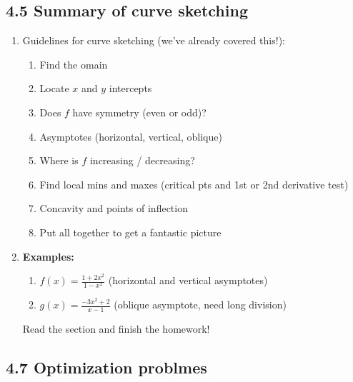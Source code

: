 \documentclass{article}
\begin{document}
\subsection{4.5 Summary of curve sketching}
\begin{enumerate}

\item Guidelines for curve sketching (we've already covered this!):
\begin{enumerate}
\item Find the omain
\item Locate $x$ and $y$ intercepts
\item Does $f$ have symmetry (even or odd)?
\item Asymptotes (horizontal, vertical, oblique)
\item Where is $f$ increasing / decreasing?
\item Find local mins and maxes (critical pts and 1st or 2nd derivative test)
\item Concavity and points of inflection 
\item Put all together to get a fantastic picture
\end{enumerate}

\item {\bf Examples:}
\begin{enumerate}
\item $f(x) = \frac{1+2x^2}{1-x^2}$ (horizontal and vertical asymptotes)
\item $ g(x) = \frac{-3x^2+2}{x-1}$ (oblique asymptote, need long division)
\end{enumerate}
Read the section and finish the homework!
\end{enumerate}


\subsection{4.7 Optimization problmes}
\end{document}
